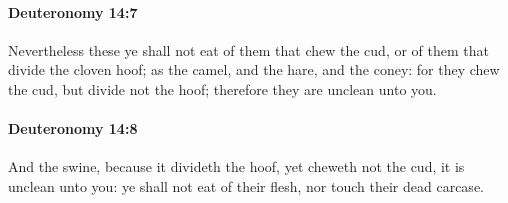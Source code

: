 		\paragraph{Deuteronomy 14:7} %
			\label{DEUTERONOMY-14-7}

			Nevertheless these ye shall not eat of them that chew the cud, or of them that divide the cloven hoof; as the camel, and the hare, and the coney: for they chew the cud, but divide not the hoof; therefore they are unclean unto you.


		\paragraph{Deuteronomy 14:8} %
			\label{DEUTERONOMY-14-8}

			And the swine, because it divideth the hoof, yet cheweth not the cud, it is unclean unto you: ye shall not eat of their flesh, nor touch their dead carcase.

